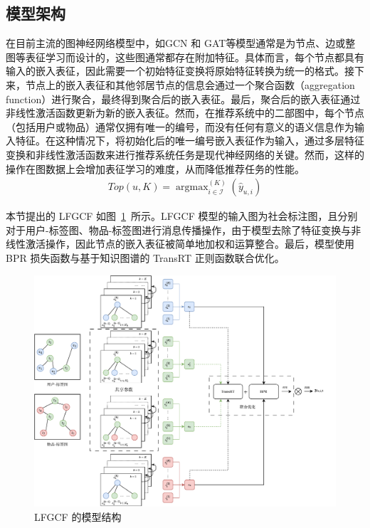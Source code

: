 \subsection{模型架构}
在目前主流的图神经网络模型中，如GCN\cite{kipf_gcn_2017} 和 GAT\cite{peter_gan_2017}等模型通常是为节点、边或整图等表征学习而设计的，这些图通常都存在附加特征。具体而言，每个节点都具有输入的嵌入表征，因此需要一个初始特征变换将原始特征转换为统一的格式。接下来，节点上的嵌入表征和其他邻居节点的信息会通过一个聚合函数（aggregation function）进行聚合，最终得到聚合后的嵌入表征。最后，聚合后的嵌入表征通过非线性激活函数更新为新的嵌入表征。然而，在推荐系统中的二部图中，每个节点（包括用户或物品）通常仅拥有唯一的编号，而没有任何有意义的语义信息作为输入特征。在这种情况下，将初始化后的唯一编号嵌入表征作为输入，通过多层特征变换和非线性激活函数来进行推荐系统任务是现代神经网络的关键\cite{he_deep_2015}。然而，这样的操作在图数据上会增加表征学习的难度，从而降低推荐任务的性能\cite{he_lightgcn_2020}。
\begin{gather}
    Top(u, K) = \mathop{argmax}^{(K)}_{i\in \mathcal{I}}(\hat{y}_{u,i})
\end{gather}

本节提出的 LFGCF 如图~\ref{lfgcf}~所示。LFGCF 模型的输入图为社会标注图，且分别对于用户-标签图、物品-标签图进行消息传播操作，由于模型去除了特征变换与非线性激活操作，因此节点的嵌入表征被简单地加权和运算整合。最后，模型使用 BPR 损失函数与基于知识图谱的 TransRT 正则函数联合优化。

\begin{figure}
    \centering
    \includegraphics[width=0.88\linewidth]{figure/lfgcf.drawio.pdf}
    \caption{LFGCF 的模型结构}
    \label{lfgcf}
\end{figure}

